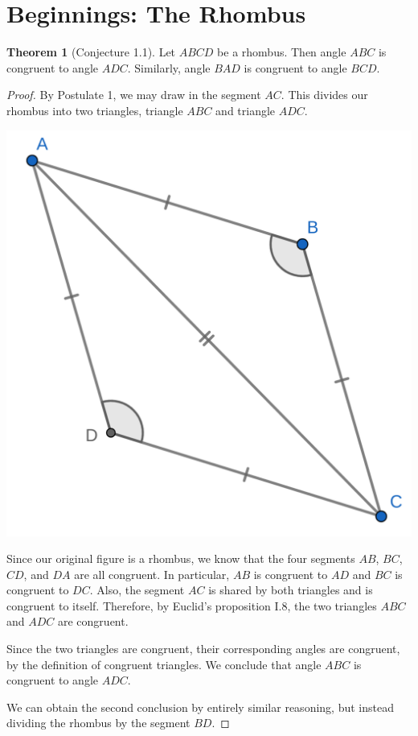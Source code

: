\documentclass{tufte-handout}
\theoremstyle{definition}
\newtheorem{theorem}{Theorem}[section]
\begin{document}
\section{Beginnings: The Rhombus}\label{section:rhombi}

\begin{theorem}[Conjecture 1.1]\label{theorem:rhombus-opp-angles}
Let $ABCD$ be a rhombus. Then angle $ABC$ is congruent to angle $ADC$. Similarly, angle $BAD$ is congruent to angle $BCD$.
\end{theorem}

\begin{proof}
By Postulate 1, we may draw in the segment $AC$. This divides our rhombus into two triangles, triangle $ABC$ and triangle $ADC$.

\begin{marginfigure}
  \includegraphics{images/rhombus_with_diagonal.png}
\end{marginfigure}

Since our original figure is a rhombus, we know that the four segments $AB$, $BC$, $CD$, and $DA$ are all congruent. In particular, $AB$ is congruent to $AD$ and $BC$ is congruent to $DC$. Also, the segment $AC$ is shared by both triangles and is congruent to itself. Therefore, by Euclid's proposition I.8, the two triangles $ABC$ and $ADC$ are congruent.

Since the two triangles are congruent, their corresponding angles are congruent, by the definition of congruent triangles. We conclude that angle $ABC$ is congruent to angle $ADC$.

We can obtain the second conclusion by entirely similar reasoning, but instead dividing the rhombus by the segment $BD$.
\end{proof}
\end{document}
